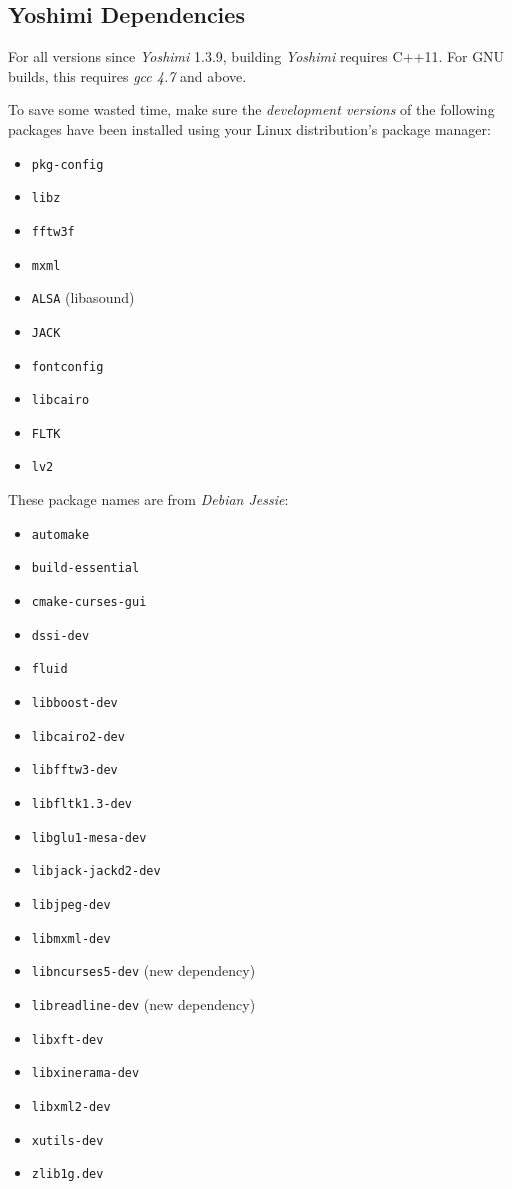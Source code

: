 \subsection{Yoshimi Dependencies}
\label{subsec:yoshimi_dependencies}

   For all versions since \textsl{Yoshimi} 1.3.9, building \textsl{Yoshimi}
   requires C++11.  For GNU builds, this requires \textsl{gcc 4.7} and above.

   To save some wasted time, make sure the \textsl{development versions}
   of the following packages have been installed using your Linux
   distribution's package manager:

   \begin{itemize}
      \item \texttt{pkg-config}
      \item \texttt{libz}
      \item \texttt{fftw3f}
      \item \texttt{mxml}
      \item \texttt{ALSA} (libasound)
      \item \texttt{JACK}
      \item \texttt{fontconfig}
      \item \texttt{libcairo}
      \item \texttt{FLTK}
      \item \texttt{lv2}
   \end{itemize}

   These package names are from \textsl{Debian Jessie}:

   \begin{itemize}
      \item \texttt{automake}
      \item \texttt{build-essential}
      \item \texttt{cmake-curses-gui}
      \item \texttt{dssi-dev}
      \item \texttt{fluid}
      \item \texttt{libboost-dev}
      \item \texttt{libcairo2-dev}
      \item \texttt{libfftw3-dev}
      \item \texttt{libfltk1.3-dev}
      \item \texttt{libglu1-mesa-dev}
      \item \texttt{libjack-jackd2-dev}
      \item \texttt{libjpeg-dev}
      \item \texttt{libmxml-dev}
      \item \texttt{libncurses5-dev} (new dependency)
      \item \texttt{libreadline-dev} (new dependency)
      \item \texttt{libxft-dev}
      \item \texttt{libxinerama-dev}
      \item \texttt{libxml2-dev}
      \item \texttt{xutils-dev}
      \item \texttt{zlib1g.dev}
   \end{itemize}

